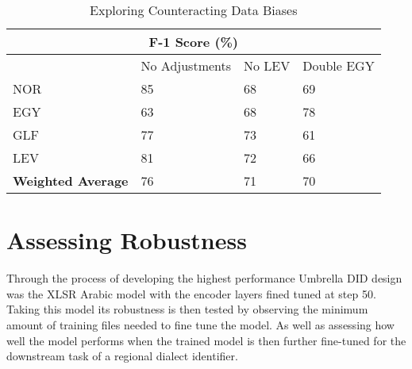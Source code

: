 \begin{table}
    \centering
    \label{tab:f1bias}
    \caption{Exploring Counteracting Data Biases }
    \begin{tabular}{|l|l|l|l|} 
    \hline
    \multicolumn{4}{|c|}{\textbf{ F-1 Score (\%)}}                    \\ 
    \hline
                              & No Adjustments & No LEV & Double EGY  \\ 
    \hline
    NOR                       & 85             & 68     & 69          \\ 
    \hline
    EGY                       & 63             & 68     & 78          \\ 
    \hline
    GLF                       & 77             & 73     & 61          \\ 
    \hline
    LEV                       & 81             & 72     & 66          \\ 
    \hline
    \textbf{Weighted Average} & 76             & 71     & 70          \\
    \hline
    \end{tabular}
    \end{table}

\begin{figure}[h!]
\end{figure}

\pagebreak
\section{Assessing Robustness}
Through the process of developing the highest performance Umbrella DID design was the XLSR Arabic model with the encoder layers fined tuned at step 50. 
Taking this model its robustness is then tested by observing the minimum amount of training files needed to fine tune the model. As well as assessing how 
well the model performs when the trained model is then further fine-tuned for the downstream task of a regional dialect identifier. 
